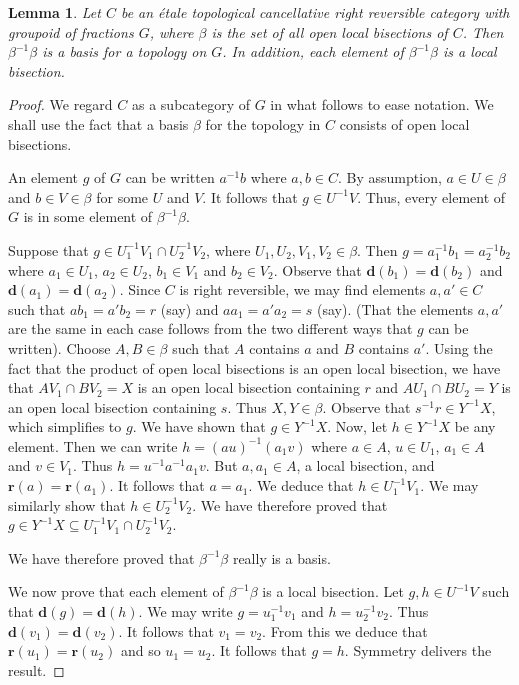 \documentclass[a4paper]{amsart}
\newtheorem{lemma}[theorem]{Lemma}
\begin{document}
\begin{lemma}\label{lem:kingdoms} 
Let $C$ be an \'etale topological cancellative right reversible category with groupoid of fractions $G$,
where $\beta$ is the set of all open local bisections of $C$.
Then $\beta^{-1} \beta$ is a basis for a topology on $G$.
In addition, each element of $\beta^{-1}\beta$ is a local bisection.
\end{lemma}
\begin{proof} We regard $C$ as a subcategory of $G$ in what follows to ease notation.
We shall use the fact that a basis $\beta$ for the topology in $C$ consists of open local bisections.

An element $g$ of $G$ can be written $a^{-1}b$ where $a,b \in C$.
By assumption, $a \in U \in \beta$ and $b \in V \in \beta$ for some $U$ and $V$.
It follows that $g \in U^{-1}V$.
Thus, every element of $G$ is in some element of $\beta^{-1} \beta$.

Suppose that $g \in U_{1}^{-1}V_{1} \cap U_{2}^{-1}V_{2}$, where $U_{1}, U_{2}, V_{1}, V_{2} \in \beta$.
Then $g = a_{1}^{-1}b_{1} = a_{2}^{-1}b_{2}$ where $a_{1} \in U_{1}$, $a_{2} \in U_{2}$, $b_{1} \in V_{1}$ and $b_{2} \in V_{2}$.
Observe that $\mathbf{d}(b_{1}) = \mathbf{d}(b_{2})$ and $\mathbf{d}(a_{1}) = \mathbf{d}(a_{2})$.
Since $C$ is right reversible, we may find elements $a,a' \in C$ such that $ab_{1} = a'b_{2} = r$ (say)
and $aa_{1} = a'a_{2} = s$ (say).
(That the elements $a,a'$ are the same in each case follows from the two different ways that $g$ can be written).
Choose $A,B \in \beta$ such that $A$ contains $a$ and $B$ contains $a'$.
Using the fact that the product of open local bisections is an open local bisection,
we have that 
$AV_{1} \cap BV_{2} = X$ is an open local bisection containing $r$
and
$AU_{1} \cap BU_{2} = Y$ is an open local bisection containing $s$.
Thus $X,Y \in \beta$.
Observe that $s^{-1}r \in Y^{-1}X$, which simplifies to $g$.
We have shown that $g \in Y^{-1}X$.
Now, let $h \in Y^{-1}X$ be any element.
Then we can write $h = (au)^{-1}(a_{1}v)$ where $a \in A$, $u \in U_{1}$, $a_{1} \in A$ and $v \in V_{1}$.
Thus $h = u^{-1}a^{-1}a_{1}v$.
But $a,a_{1} \in A$, a local bisection, and $\mathbf{r}(a) = \mathbf{r}(a_{1})$.
It follows that $a = a_{1}$.
We deduce that $h \in U_{1}^{-1}V_{1}$.
We may similarly show that $h \in U_{2}^{-1}V_{2}$.
We have therefore proved that $g \in Y^{-1}X \subseteq U_{1}^{-1}V_{1} \cap U_{2}^{-1}V_{2}$.

We have therefore proved that $\beta^{-1}\beta$ really is a basis.

We now prove that each element of $\beta^{-1}\beta$ is a local bisection.
Let $g,h \in U^{-1}V$ such that $\mathbf{d}(g) = \mathbf{d}(h)$.
We may write $g = u_{1}^{-1}v_{1}$ and $h = u_{2}^{-1}v_{2}$.
Thus $\mathbf{d}(v_{1}) = \mathbf{d}(v_{2})$.
It follows that $v_{1} = v_{2}$.
From this we deduce that $\mathbf{r}(u_{1}) = \mathbf{r}(u_{2})$ and so $u_{1} = u_{2}$.
It follows that $g = h$.
Symmetry delivers the result.
\end{proof}
\end{document}
